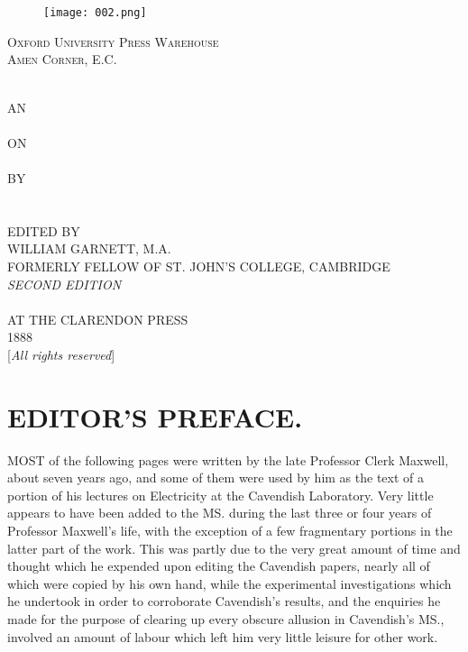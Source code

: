 \documentclass[12pt,oneside]{book}[2021/10/04]
\newcommand{\Heading}{\centering\normalfont}
\newcommand{\Chapter}[1]{\section*{\large\Heading #1}}
\newcommand{\Runhead}[1]{\fancyhead[C]{\iffloatpage{}{\small#1}}}
\newcommand{\¬}{\hphantom{0}}
\newcommand{\newchapter}{\newpage\thispagestyle{empty}}
\begin{document}
\newchapter
\hspace{0pt}
\vfill
\begin{center}
{\gfont {}}\\[0.3cm]
\small
{}\\
\begin{figure}[ht!]
\centering
\texttt{[image: 002.png]}
\end{figure}
\textsc{Oxford University Press Warehouse\\[0.3cm]
Amen Corner, E.C.}
\end{center}
\vfill

\newchapter
\begin{center}
{\Large\gfont {}}\\[8mm]
AN\\[0.5cm]
\LARGE
{}\\[0.6cm]
\small
ON\\[0.5cm]
\Huge
{}\\[0.9cm]
\footnotesize
BY\\[0.5cm]
\Large
{}\\[0.2cm]
\scriptsize
{}\\[4mm]
EDITED BY\\[0.2cm]
\large
WILLIAM GARNETT, M.A.\\[0.2cm]
\scriptsize
FORMERLY FELLOW OF ST. JOHN'S COLLEGE, CAMBRIDGE\\[1cm]
\normalsize
\textit{SECOND EDITION}\\[1cm]
\Large
{\gfont {}}\\[0.1cm]
\normalsize
AT THE CLARENDON PRESS\\[0.1cm]
1888\\[0.2cm]
{[}\textit{All rights reserved}{]}
\end{center}
\newchapter
\normalsize
\Chapter{EDITOR'S PREFACE.}
\Runhead{EDITOR'S PREFACE.}

\lettrine[lines=2, findent=0pt, loversize=0.1]{M}{OST} of the following pages were written by the late Professor
Clerk Maxwell, about seven years ago, and some of
them were used by him as the text of a portion of his lectures
on Electricity at the Cavendish Laboratory. Very little appears
to have been added to the MS. during the last three
or four years of Professor Maxwell's life, with the exception
of a few fragmentary portions in the latter part of the work.
This was partly due to the very great amount of time and
thought which he expended upon editing the Cavendish papers,
nearly all of which were copied by his own hand, while the
experimental investigations which he undertook in order to
corroborate Cavendish's results, and the enquiries he made
for the purpose of clearing up every obscure allusion in
Cavendish's MS., involved an amount of labour which left
him very little leisure for other work.
\end{document}
